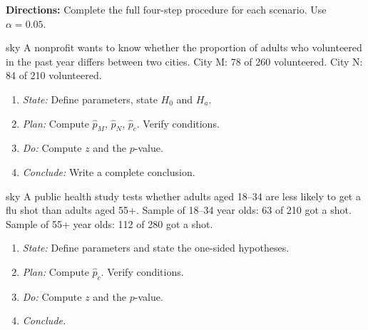 \documentclass[10pt]{article}
\begin{document}
\namepartnerperiod

\vspace{0.15in}

\textbf{Directions:} Complete the full four-step procedure for each scenario. Use $\alpha = 0.05$.

\begin{scenariobox}{sky}
A nonprofit wants to know whether the proportion of adults who volunteered in the past year
differs between two cities. City M: 78 of 260 volunteered. City N: 84 of 210 volunteered.

\begin{enumerate}[label=\arabic*.]
  \item \textit{State:} Define parameters, state $H_0$ and $H_a$. 

  \item \textit{Plan:} Compute $\hat p_M$, $\hat p_N$, $\hat p_c$. Verify conditions.

  \item \textit{Do:} Compute $z$ and the $p$-value.

  \item \textit{Conclude:} Write a complete conclusion. 
\end{enumerate}
\end{scenariobox}

\begin{scenariobox}{sky}
A public health study tests whether adults aged 18--34 are less likely to get a flu shot
than adults aged 55+. Sample of 18--34 year olds: 63 of 210 got a shot.
Sample of 55+ year olds: 112 of 280 got a shot.

\begin{enumerate}[label=\arabic*.]
  \item \textit{State:} Define parameters and state the one-sided hypotheses. 

  \item \textit{Plan:} Compute $\hat p_c$. Verify conditions.

  \item \textit{Do:} Compute $z$ and the $p$-value.

  \item \textit{Conclude.} 
\end{enumerate}
\end{scenariobox}
\end{document}

